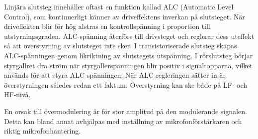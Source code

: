 Linjära slutsteg innehåller oftast en funktion kallad ALC (Automatic Level
Control), som kontinuerligt känner av driveffektens inverkan på slutsteget.
När driveffekten blir för hög alstras en kontrollspänning i proportion till
utstyrningsgraden.
ALC-spänning återförs till drivsteget och reglerar dess uteffekt så att
överstyrning av slutsteget inte sker.
I transistoriserade slutsteg skapas ALC-spänningen genom likriktning av
slutstegets utspänning.
I rörslutsteg börjar styrgallret dra ström när styrgallerspänningen
blir positiv i signaltopparna, vilket används för att styra ALC-spänningen.
När ALC-regleringen sätter in är överstyrningen således redan ett faktum.
Överstyrning kan ske både på LF- och HF-nivå.

En orsak till övermodulering är för stor amplitud på den modulerande signalen.
Detta kan bland annat avhjälpas med inställning av mikrofonförstärkaren och
riktig mikrofonhantering.
